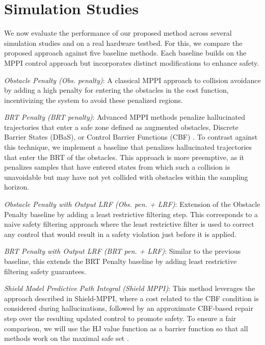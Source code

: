 \section{\label{cases}Simulation Studies}

We now evaluate the performance of our proposed method across several simulation studies and on a real hardware testbed. For this, we compare the proposed approach against five baseline methods. Each baseline builds on the MPPI control approach but incorporates distinct modifications to enhance safety.\par

\noindent \textit{Obstacle Penalty (Obs. penalty)}: A classical MPPI approach to collision avoidance by adding a high penalty for entering the obstacles in the cost function, incentivizing the system to avoid these penalized regions.

\noindent \textit{BRT Penalty (BRT penalty)}: Advanced MPPI methods penalize hallucinated trajectories that enter a safe zone defined as augmented obstacles, Discrete Barrier States (DBaS), or Control Barrier Functions (CBF) \cite{testouri2024saferealtimemotionplanning,discrete_barrier_2024,parwana2024modelpredictivepathintegral,RAPA_2024}. To contrast against this technique, we implement a baseline that penalizes hallucinated trajectories that enter the BRT of the obstacles. This approach is more preemptive, as it penalizes samples that have entered states from which such a collision is unavoidable but may have not yet collided with obstacles within the sampling horizon.

\noindent \textit{Obstacle Penalty with Output LRF (Obs. pen. + LRF)}: Extension of the Obstacle Penalty baseline by adding a least restrictive filtering step. This corresponds to a naive safety filtering approach where the least restrictive filter is used to correct any control that would result in a safety violation just before it is applied.

\noindent \textit{BRT Penalty with Output LRF (BRT pen. + LRF)}: Similar to the previous baseline, this extends the BRT Penalty baseline by adding least restrictive filtering safety guarantees.

\noindent \textit{Shield Model Predictive Path Integral (Shield MPPI)}: This method leverages the approach described in Shield-MPPI\cite{mppi_shield}, where a cost related to the CBF condition is considered during hallucinations, followed by an approximate CBF-based repair step over the resulting updated control to promote safety. To ensure a fair comparison, we will use the HJ value function as a barrier function so that all methods work on the maximal safe set \cite{cbvf}.

